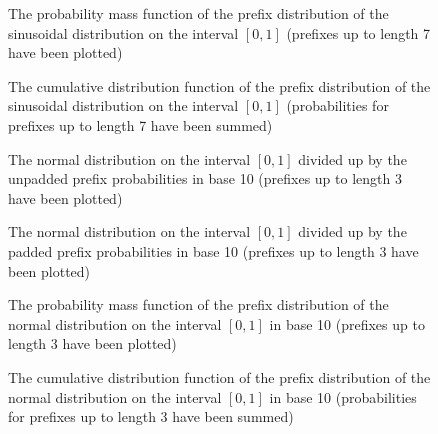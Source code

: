 \begin{figure}
    \centering
    
    \caption{The probability mass function of the prefix distribution of the sinusoidal distribution on the interval $[0,1]$ (prefixes up to length 7 have been plotted)}
    \label{fig:sin_bin_pmf_full}\vspace{2em}
    
    
    \caption{The cumulative distribution function of the prefix distribution of the sinusoidal distribution on the interval $[0,1]$ (probabilities for prefixes up to length 7 have been summed)}
    \label{fig:sin_bin_cdf_full}
\end{figure}

\begin{figure}
	\centering
	
	\caption{The normal distribution on the interval $[0,1]$ divided up by the unpadded prefix probabilities in base 10 (prefixes up to length 3 have been plotted)}
	\label{fig:normal_dec_cover}\vspace{2em}
	
	
	\caption{The normal distribution on the interval $[0,1]$ divided up by the padded prefix probabilities in base 10 (prefixes up to length 3 have been plotted)}
	\label{fig:normal_dec_cover_padded}
\end{figure}

\begin{figure}
	\centering
	
	\caption{The probability mass function of the prefix distribution of the normal distribution on the interval $[0,1]$ in base 10 (prefixes up to length 3 have been plotted)}
	\label{fig:normal_dec_pmf}\vspace{2em}
	
	
	\caption{The cumulative distribution function of the prefix distribution of the normal distribution on the interval $[0,1]$ in base 10 (probabilities for prefixes up to length 3 have been summed)}
	\label{fig:normal_dec_cdf}
\end{figure}
